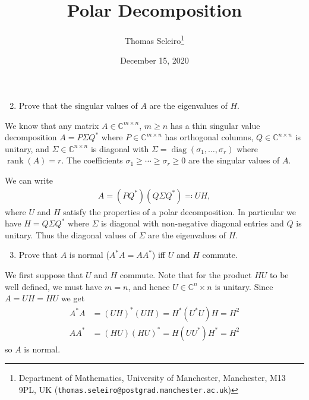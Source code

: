 \documentclass[10pt, A4paper]{article}
\newcommand{\mxn}{m \times n}
\newcommand{\nxn}{n \times n}
\DeclareMathOperator{\diag}{diag}
\DeclareMathOperator{\rank}{rank}
\begin{document}
\title{Polar Decomposition}
\author{Thomas Seleiro\thanks
	{Department of Mathematics, University of Manchester, 
	Manchester, M13 9PL, UK
	(\texttt{thomas.seleiro@postgrad.manchester.ac.uk})}}
\date{December 15, 2020}
\maketitle


\begin{enumerate}
	\setcounter{enumi}{1}
	\item Prove that the singular values of $A$ are the eigenvalues of $H$.
\end{enumerate}

We know that any matrix $A\in\mathbb{C}^{\mxn}$, $m\geq n$ has 
a thin singular value decomposition $A = P \Sigma Q^*$ where $P \in
\mathbb{C}^{\mxn}$ has orthogonal columns, $Q \in 
\mathbb{C}^{\nxn}$ is unitary, and $\Sigma \in 
\mathbb{C}^{\nxn}$ is diagonal with $\Sigma = \diag(\sigma_1, 
\ldots, \sigma_r)$ where $\rank(A) = r$. The coefficients $\sigma_1 
\geq \cdots \geq \sigma_r \geq 0$ are the singular values of $A$.

We can write
\begin{align}
	A = (PQ^*) (Q \Sigma Q^*) \eqqcolon UH,
	\label{eq:PolarSVD}
\end{align}
where $U$ and $H$ satisfy the properties of a polar decomposition.
In particular we have $H = Q \Sigma Q^*$ where $\Sigma$ is diagonal 
with non-negative diagonal entries and $Q$ is unitary.
Thus the diagonal values of $\Sigma$ are the eigenvalues of $H$.





\vspace{0.2cm}
\begin{enumerate}
	\setcounter{enumi}{2}
	\item Prove that $A$ is normal ($A^*A = AA^*$) iff $U$ and $H$
	commute.
\end{enumerate}

We first suppose that $U$ and $H$ commute. Note that for the product
$HU$ to be well defined, we must have $m = n$, and hence
$U\in\mathbb{C}^\nxn$ is unitary. Since $A = UH = HU$ we get
\begin{align}
	\label{eq:AstarA}
	A^*A &= (UH)^* (UH) = H^*(U^*U)H = H^2 \\
	AA^* &= (HU) (HU)^* = H(UU^*)H^* = H^2 \nonumber
\end{align}
so $A$ is normal.
\end{document}
